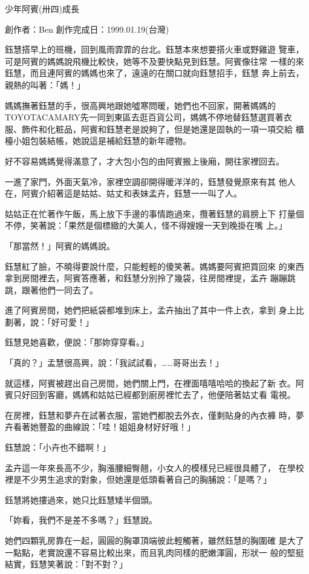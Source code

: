 



少年阿賓(卅四)成長

創作者：Ben
創作完成日：1999.01.19(台灣)


鈺慧搭早上的班機，回到風雨霏霏的台北。鈺慧本來想要搭火車或野雞遊
覽車，可是阿賓的媽媽說飛機比較快，她等不及要快點見到鈺慧。阿賓像往常
一樣的來鈺慧，而且連阿賓的媽媽也來了，遠遠的在關口就向鈺慧招手，鈺慧
奔上前去，親熱的叫著：「媽！」

媽媽撫著鈺慧的手，很高興地跟她噓寒問暖，她們也不回家，開著媽媽的
TOYOTACAMARY先一同到東區去逛百貨公司，媽媽不停地替鈺慧選買著衣
服、飾件和化粧品，阿賓和鈺慧老是說夠了，但是她還是固執的一項一項交給
櫃檯小姐包裝結帳，她說這是補給鈺慧的新年禮物。

好不容易媽媽覺得滿意了，才大包小包的由阿賓搬上後廂，開往家裡回去。

一進了家門，外面天氣冷，家裡空調卻開得暖洋洋的，鈺慧發覺原來有其
他人在，阿賓介紹著這是姑姑、姑丈和表妹孟卉，鈺慧一一叫了人。

姑姑正在忙著作午飯，馬上放下手邊的事情跑過來，攬著鈺慧的肩膀上下
打量個不停，笑著說：「果然是個標緻的大美人，怪不得嫂嫂一天到晚掛在嘴
上。」

「那當然！」阿賓的媽媽說。

鈺慧紅了臉，不曉得要說什麼，只能輕輕的傻笑著。媽媽要阿賓把買回來
的東西拿到房間裡去，阿賓答應著，和鈺慧分別拎了幾袋，往房間裡提，孟卉
蹦蹦跳跳，跟著他們一同去了。

進了阿賓房間，她們把紙袋都堆到床上，孟卉抽出了其中一件上衣，拿到
身上比劃著，說：「好可愛！」

鈺慧見她喜歡，便說：「那妳穿穿看。」

「真的？」孟慧很高興，說：「我試試看，……哥哥出去！」

就這樣，阿賓被趕出自己房間，她們關上門，在裡面嘻嘻哈哈的換起了新
衣。阿賓只好回到客廳，媽媽和姑姑已經都到廚房裡忙去了，他便陪著姑丈看
電視。

在房裡，鈺慧和夢卉在試著衣服，當她們都脫去外衣，僅剩貼身的內衣褲
時，夢卉看著她豐盈的曲線說：「哇！姐姐身材好好哦！」

鈺慧說：「小卉也不錯啊！」

孟卉這一年來長高不少，胸漲腰細臀翹，小女人的模樣兒已經很具體了，
在學校裡是不少男生追求的對象，但她還是低頭看著自己的胸脯說：「是嗎？」

鈺慧將她摟過來，她只比鈺慧矮半個頭。

「妳看，我們不是差不多嗎？」鈺慧說。

她們四顆乳房靠在一起，圓圓的胸罩頂端彼此輕觸著，雖然鈺慧的胸圍確
是大了一點點，老實說還不容易比較出來，而且乳肉同樣的肥嫩渾圓，形狀一
般的堅挺結實，鈺慧笑著說：「對不對？」

